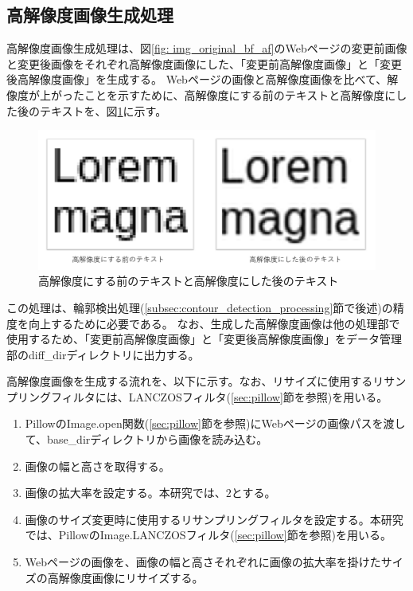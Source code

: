 \subsection{高解像度画像生成処理}\label{subsec:Generate_high_images}
高解像度画像生成処理は、図\ref{fig: img_original_bf_af}のWebページの変更前画像と変更後画像をそれぞれ高解像度画像にした、「変更前高解像度画像」と「変更後高解像度画像」を生成する。
Webページの画像と高解像度画像を比べて、解像度が上がったことを示すために、高解像度にする前のテキストと高解像度にした後のテキストを、図\ref{fig: high_compare}に示す。
\begin{figure}[tp]
    \begin{center}
        \includegraphics[width=1.0\columnwidth]{image/4_high_compare.png}
        \caption{高解像度にする前のテキストと高解像度にした後のテキスト}
        \label{fig: high_compare}
    \end{center}
\end{figure}
この処理は、輪郭検出処理(\ref{subsec:contour_detection_processing}節で後述)の精度を向上するために必要である。
なお、生成した高解像度画像は他の処理部で使用するため、「変更前高解像度画像」と「変更後高解像度画像」をデータ管理部のdiff\_dirディレクトリに出力する。
\par
高解像度画像を生成する流れを、以下に示す。なお、リサイズに使用するリサンプリングフィルタには、LANCZOSフィルタ(\ref{sec:pillow}節を参照)を用いる。
\begin{enumerate}
    \item PillowのImage.open関数(\ref{sec:pillow}節を参照)にWebページの画像パスを渡して、base\_dirディレクトリから画像を読み込む。
    \item 画像の幅と高さを取得する。
    \item 画像の拡大率を設定する。本研究では、$2$とする。
    \item 画像のサイズ変更時に使用するリサンプリングフィルタを設定する。本研究では、PillowのImage.LANCZOSフィルタ(\ref{sec:pillow}節を参照)を用いる。
    \item Webページの画像を、画像の幅と高さそれぞれに画像の拡大率を掛けたサイズの高解像度画像にリサイズする。
\end{enumerate}


